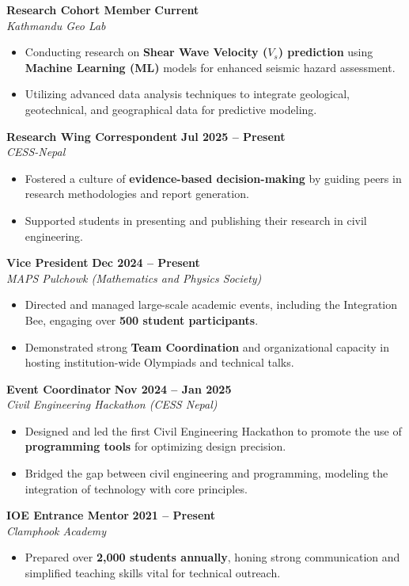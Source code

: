 \documentclass[letterpaper,10pt]{article}
\newcommand{\jobtitle}[3]{
  \vspace{3pt}
  \noindent\textbf{\large #1}
  \hfill
  \textbf{#3}
  \\
  \textit{#2}
  \vspace{2pt}
}
\begin{document}
\jobtitle{Research Cohort Member}{Kathmandu Geo Lab}{Current}
\begin{itemize}
    \item Conducting research on \textbf{Shear Wave Velocity ($V_s$) prediction} using \textbf{Machine Learning (ML)} models for enhanced seismic hazard assessment.
    \item Utilizing advanced data analysis techniques to integrate geological, geotechnical, and geographical data for predictive modeling.
\end{itemize}

\jobtitle{Research Wing Correspondent}{CESS-Nepal}{Jul 2025 – Present}
\begin{itemize}
    \item Fostered a culture of \textbf{evidence-based decision-making} by guiding peers in research methodologies and report generation.
    \item Supported students in presenting and publishing their research in civil engineering.
\end{itemize}

\jobtitle{Vice President}{MAPS Pulchowk (Mathematics and Physics Society)}{Dec 2024 – Present}
\begin{itemize}
    \item Directed and managed large-scale academic events, including the Integration Bee, engaging over \textbf{500 student participants}.
    \item Demonstrated strong \textbf{Team Coordination} and organizational capacity in hosting institution-wide Olympiads and technical talks.
\end{itemize}

\jobtitle{Event Coordinator }{Civil Engineering Hackathon (CESS Nepal)}{Nov 2024 – Jan 2025}
\begin{itemize}
    \item Designed and led the first Civil Engineering Hackathon to promote the use of \textbf{programming tools} for optimizing design precision.
    \item Bridged the gap between civil engineering and programming, modeling the integration of technology with core principles.
\end{itemize}

\jobtitle{IOE Entrance Mentor }{Clamphook Academy}{2021 – Present}
\begin{itemize}
    \item Prepared over \textbf{2,000 students annually}, honing strong communication and simplified teaching skills vital for technical outreach.
\end{itemize}
\end{document}
